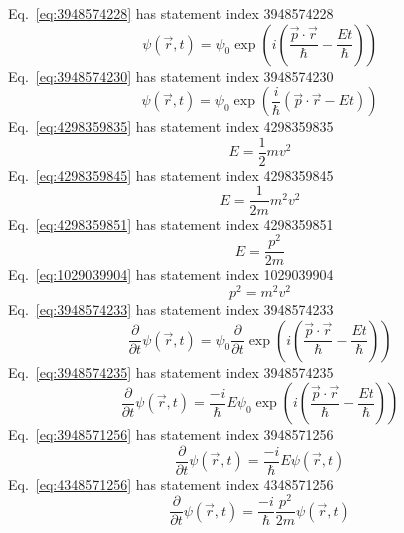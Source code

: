 \documentclass[12pt]{report}
\begin{document}
Eq.~\ref{eq:3948574228} has statement index 3948574228
\begin{equation}
\psi(\vec{r},t) = \psi_0 \exp\left(i\left(\frac{\vec{p}\cdot\vec{r}}{\hbar} - \frac{E t}{\hbar}  \right) \right)
\label{eq:3948574228}
\end{equation}
Eq.~\ref{eq:3948574230} has statement index 3948574230
\begin{equation}
\psi(\vec{r},t) = \psi_0 \exp\left(\frac{i}{\hbar}\left(\vec{p}\cdot\vec{r} - E t \right) \right)
\label{eq:3948574230}
\end{equation}
Eq.~\ref{eq:4298359835} has statement index 4298359835
\begin{equation}
E = \frac{1}{2}m v^2
\label{eq:4298359835}
\end{equation}
Eq.~\ref{eq:4298359845} has statement index 4298359845
\begin{equation}
E = \frac{1}{2m}m^2 v^2
\label{eq:4298359845}
\end{equation}
Eq.~\ref{eq:4298359851} has statement index 4298359851
\begin{equation}
E = \frac{p^2}{2m}
\label{eq:4298359851}
\end{equation}
Eq.~\ref{eq:1029039904} has statement index 1029039904
\begin{equation}
p^2 = m^2 v^2
\label{eq:1029039904}
\end{equation}
Eq.~\ref{eq:3948574233} has statement index 3948574233
\begin{equation}
\frac{\partial}{\partial t}\psi(\vec{r},t) = \psi_0 \frac{\partial}{\partial t}\exp\left(i\left(\frac{\vec{p}\cdot\vec{r}}{\hbar} - \frac{E t}{\hbar}  \right) \right)
\label{eq:3948574233}
\end{equation}
Eq.~\ref{eq:3948574235} has statement index 3948574235
\begin{equation}
\frac{\partial}{\partial t}\psi(\vec{r},t) = \frac{-i}{\hbar}E \psi_0 \exp\left(i\left(\frac{\vec{p}\cdot\vec{r}}{\hbar} - \frac{E t}{\hbar}  \right) \right)
\label{eq:3948574235}
\end{equation}
Eq.~\ref{eq:3948571256} has statement index 3948571256
\begin{equation}
\frac{\partial}{\partial t}\psi(\vec{r},t) = \frac{-i}{\hbar}E \psi(\vec{r},t)
\label{eq:3948571256}
\end{equation}
Eq.~\ref{eq:4348571256} has statement index 4348571256
\begin{equation}
\frac{\partial}{\partial t}\psi(\vec{r},t) = \frac{-i}{\hbar}\frac{p^2}{2 m} \psi(\vec{r},t)
\label{eq:4348571256}
\end{equation}
\end{document}
